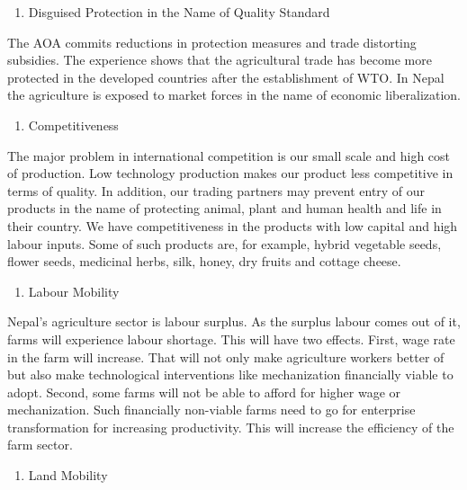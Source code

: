 \documentclass[
  openany]{book}
\providecommand{\tightlist}{%
  \setlength{\itemsep}{0pt}\setlength{\parskip}{0pt}}
\begin{document}
\begin{enumerate}
\def\labelenumi{\arabic{enumi}.}
\setcounter{enumi}{1}
\tightlist
\item
  Disguised Protection in the Name of Quality Standard
\end{enumerate}

The AOA commits reductions in protection measures and trade distorting subsidies. The experience shows that the agricultural trade has become more protected in the developed countries after the establishment of WTO. In Nepal the agriculture is exposed to market forces in the name of economic liberalization.

\begin{enumerate}
\def\labelenumi{\arabic{enumi}.}
\setcounter{enumi}{2}
\tightlist
\item
  Competitiveness
\end{enumerate}

The major problem in international competition is our small scale and high cost of production. Low technology production makes our product less competitive in terms of quality. In addition, our trading partners may prevent entry of our products in the name of protecting animal, plant and human health and life in their country. We have competitiveness in the products with low capital and high labour inputs. Some of such products are, for example, hybrid vegetable seeds, flower seeds, medicinal herbs, silk, honey, dry fruits and cottage cheese.

\begin{enumerate}
\def\labelenumi{\arabic{enumi}.}
\setcounter{enumi}{3}
\tightlist
\item
  Labour Mobility
\end{enumerate}

Nepal's agriculture sector is labour surplus. As the surplus labour comes out of it, farms will experience labour shortage. This will have two effects. First, wage rate in the farm will increase. That will not only make agriculture workers better of but also make technological interventions like mechanization financially viable to adopt. Second, some farms will not be able to afford for higher wage or mechanization. Such financially non-viable farms need to go for enterprise transformation for increasing productivity. This will increase the efficiency of the farm sector.

\begin{enumerate}
\def\labelenumi{\arabic{enumi}.}
\setcounter{enumi}{4}
\tightlist
\item
  Land Mobility
\end{enumerate}
\end{document}
